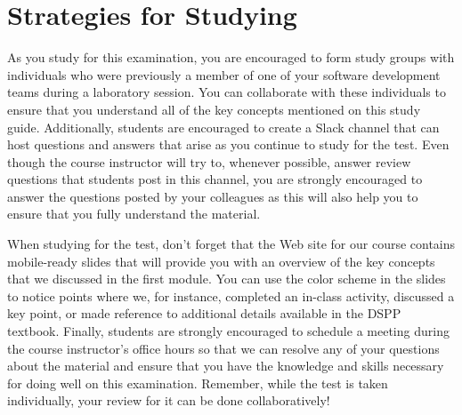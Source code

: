 \vspace*{-.2in}
\section*{Strategies for Studying}
\vspace*{-.1in}

As you study for this examination, you are encouraged to form study groups with individuals who were previously a member
of one of your software development teams during a laboratory session. You can collaborate with these individuals to
ensure that you understand all of the key concepts mentioned on this study guide. Additionally, students are encouraged
to create a Slack channel that can host questions and answers that arise as you continue to study for the test.  Even
though the course instructor will try to, whenever possible, answer review questions that students post in this channel,
you are strongly encouraged to answer the questions posted by your colleagues as this will also help you to ensure that
you fully understand the material.

When studying for the test, don't forget that the Web site for our course contains mobile-ready slides that will provide
you with an overview of the key concepts that we discussed in the first module. You can use the color scheme in the
slides to notice points where we, for instance, completed an in-class activity, discussed a key point, or made reference
to additional details available in the DSPP textbook. Finally, students are strongly encouraged to schedule a meeting
during the course instructor's office hours so that we can resolve any of your questions about the material and ensure
that you have the knowledge and skills necessary for doing well on this examination. Remember, while the test is taken
individually, your review for it can be done collaboratively!


